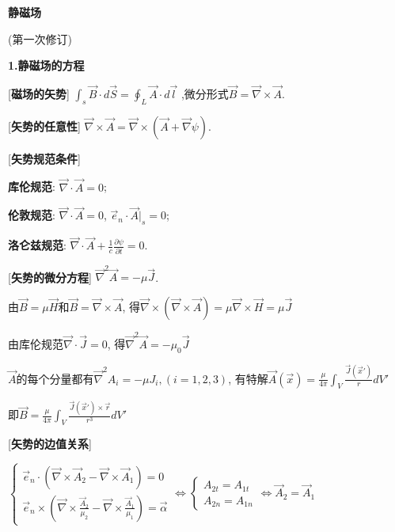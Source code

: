 


 \begin{center} 
 \Large \textbf{静磁场}\par
 (第一次修订)
\end{center}
 
\large 
\begin{center}
 \textbf{1.静磁场的方程}
\end{center}

[\textbf{磁场的矢势}] $\int_s\vec B\cdot d\vec S=\oint_L\vec A\cdot d\vec l$ ,微分形式$\vec B=\vec \nabla\times\vec A$.\par

[\textbf{矢势的任意性}] $\vec\nabla\times\vec A=\vec\nabla\times (\vec A+\vec\nabla\psi)$.\par

[\textbf{矢势规范条件}] \par
\qquad \textbf{库伦规范}: $\vec\nabla\cdot\vec A=0$;\par
\qquad \textbf{伦敦规范}: $\vec\nabla\cdot\vec A=0$, $\vec e_n\cdot\vec A|_s=0$;\par
\qquad \textbf{洛仑兹规范}: $\vec\nabla\cdot\vec A+\frac{1}{c}\frac{\partial\psi}{\partial t}=0$.\par

[\textbf{矢势的微分方程}] $\vec\nabla^2\vec A=-\mu\vec J$.\par
\qquad 由$\vec B=\mu\vec H$和$\vec B=\vec\nabla\times\vec A$, 得$\vec\nabla\times(\vec\nabla\times\vec A)=\mu\vec\nabla\times\vec H=\mu\vec J$\par
\qquad 由库伦规范$\vec\nabla\cdot\vec J=0$, 得$\vec\nabla^2\vec A=-\mu_0\vec J$\par
\qquad $\vec A$的每个分量都有$\vec\nabla^2 A_i=-\mu J_i, (i=1,2,3)$, 有特解$\vec A(\vec x)=\frac{\mu}{4\pi}\int_V\frac{\vec J(\vec x')}{r}dV'$\par
\qquad \quad 即$\vec B=\frac{\mu}{4\pi}\int_V\frac{\vec J(\vec x')\times\vec r}{r^3}dV'$\par

[\textbf{矢势的边值关系}]\par
\qquad $\begin{cases}\vec e_n\cdot(\vec\nabla\times\vec A_2-\vec\nabla\times\vec A_1)=0\\ \vec e_n\times(\vec\nabla\times\frac{\vec A_2}{\mu_2}-\vec\nabla\times\frac{\vec A_1}{\mu_1})=\vec\alpha \end{cases} \Leftrightarrow \begin{cases}A_{2t}=A_{1t}\\A_{2n}=A_{1n}\end{cases}\Leftrightarrow \vec A_2=\vec A_1$\par

